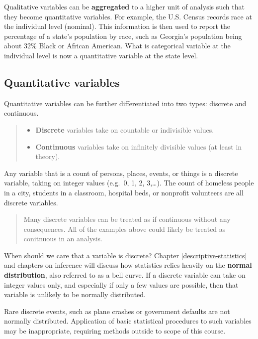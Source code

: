 \documentclass[
]{book}
\providecommand{\tightlist}{%
  \setlength{\itemsep}{0pt}\setlength{\parskip}{0pt}}
\begin{document}
Qualitative variables can be \textbf{aggregated} to a higher unit of analysis such that they become quantitative variables. For example, the U.S. Census records race at the individual level (nominal). This information is then used to report the percentage of a state's population by race, such as Georgia's population being about 32\% Black or African American. What is categorical variable at the individual level is now a quantitative variable at the state level.

\hypertarget{quantitative-variables}{%
\subsection{Quantitative variables}\label{quantitative-variables}}

Quantitative variables can be further differentiated into two types: discrete and continuous.

\begin{quote}
\begin{itemize}
\tightlist
\item
  \textbf{Discrete} variables take on countable or indivisible values.
\item
  \textbf{Continuous} variables take on infinitely divisible values (at least in theory).
\end{itemize}
\end{quote}

Any variable that is a count of persons, places, events, or things is a discrete variable, taking on integer values (e.g.~0, 1, 2, 3,\ldots). The count of homeless people in a city, students in a classroom, hospital beds, or nonprofit volunteers are all discrete variables.

\begin{quote}
Many discrete variables can be treated as if continuous without any consequences. All of the examples above could likely be treated as conitnuous in an analysis.
\end{quote}

When should we care that a variable is discrete? Chapter \ref{descriptive-statistics} and chapters on inference will discuss how statistics relies heavily on the \textbf{normal distribution}, also referred to as a bell curve. If a discrete variable can take on integer values only, and especially if only a few values are possible, then that variable is unlikely to be normally distributed.

Rare discrete events, such as plane crashes or government defaults are not normally distributed. Application of basic statistical procedures to such variables may be inappropriate, requiring methods outside to scope of this course.
\end{document}
